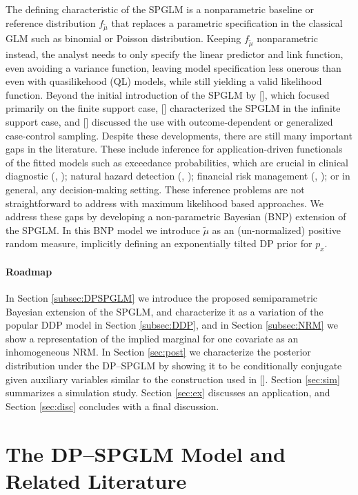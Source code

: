 \documentclass{article}[12pt]
\newcommand{\blau}{\color{blue}}
\newcommand{\citeaa}[1]{\citeauthor{#1}, \href{cite.#1}{\textcolor{blue}{\citeyear{#1}}}}     %
\newcommand{\citeab}[1]{\citeauthor{#1} [\href{cite.#1}{\textcolor{blue}{\citeyear{#1}}}]}  %
\newcommand{\refa}[1]{\textcolor{blue}{\ref{#1}}} %
\newcommand{\tmu}{\widetilde{\mu}}
\begin{document}
The defining characteristic of the SPGLM is a nonparametric baseline
or reference distribution $f_{\tmu}$ that replaces a parametric
specification in the classical GLM such as binomial or Poisson
distribution. Keeping $f_{\tmu}$ nonparametric instead, the analyst
needs to only specify the linear predictor and link function, even
avoiding a variance function, leaving model specification less onerous than
even with quasilikehood (QL) models, while still yielding a valid
likelihood function.
Beyond the initial introduction of the SPGLM by
\citeab{rathouz2009generalized}, which focused primarily on the
finite support case,  
\citeab{huang2014joint} characterized the SPGLM in the infinite support case, and
\citeab{maronge2023generalized} discussed the use with outcome-dependent or generalized case-control sampling.
Despite these developments, there are still many important gaps in the
literature. These include inference for application-driven functionals of
the fitted models such as exceedance probabilities, which are crucial
in clinical diagnostic (\citeaa{paul2021dynamics}); natural hazard
detection (\citeaa{kossin2020global}); financial risk management
(\citeaa{taylor2016using}); or in general, any decision-making
setting. These inference problems are not straightforward to address with
maximum likelihood based approaches. We address these gaps by developing a non-parametric Bayesian (BNP)
extension of the SPGLM.
In this BNP model we introduce $\tmu$ as an (un-normalized) positive
random measure, implicitly defining an exponentially tilted DP prior
for $p_x$. 


\paragraph*{\blau Roadmap}
In Section \refa{subsec:DPSPGLM} we introduce the proposed semiparametric Bayesian extension of the SPGLM, and characterize it as a variation of the popular DDP model in Section \refa{subsec:DDP}, and in Section \refa{subsec:NRM} we show a representation of the implied marginal for one covariate as an inhomogeneous NRM.
In Section \refa{sec:post} we characterize the posterior distribution
under the DP--SPGLM by showing it to be conditionally conjugate given
auxiliary variables similar to the construction used in
\citeab{james2009posterior}.  
Section \refa{sec:sim} summarizes a simulation study. Section \refa{sec:ex} discusses an application, and Section \refa{sec:disc} concludes with a final discussion.

\section{The DP--SPGLM Model and Related Literature}
\label{sec:DPSPGLM}
\end{document}
